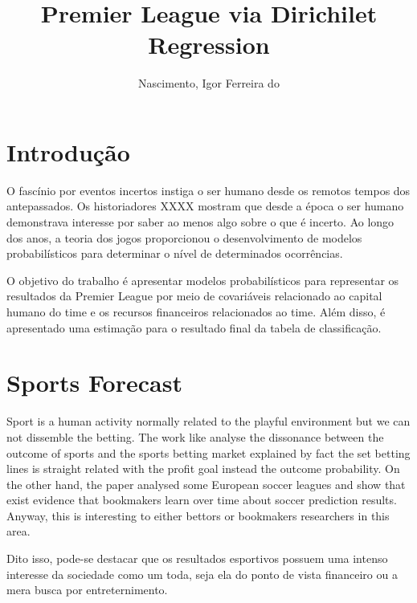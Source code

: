 \documentclass[doc,apacite,oneside,a4paper,12pt]{apa6}
\title{Premier League via Dirichilet Regression }
\author{Nascimento, Igor Ferreira do}
\affiliation{Departamento de Administração - UnB; Laboratório de Aprendizado de Máquina em Finanças}
\begin{document}
\singlespacing 
\justify

\maketitle    
                        
\section{Introdução}
\label{sec:int}
\noindent

O fascínio por eventos incertos instiga o ser humano desde os remotos tempos dos antepassados. Os historiadores XXXX mostram que desde a época o ser humano demonstrava interesse por saber ao menos algo sobre o que é incerto. Ao longo dos anos, a teoria dos jogos proporcionou o desenvolvimento de modelos probabilísticos para determinar o nível de determinados ocorrências.



O objetivo do trabalho é apresentar modelos probabilísticos para representar os resultados da Premier League por meio de covariáveis relacionado ao capital humano do time e os recursos financeiros relacionados ao time. Além disso, é apresentado uma estimação para o resultado final da tabela de classificação.

\section{Sports Forecast}
\label{sec:foresport}
\noindent



Sport is a human activity normally related to the playful environment but we can not dissemble the betting. The work like \cite{Kain2014} analyse the dissonance between the outcome of sports and the sports betting market explained by fact the set betting lines is straight related with the profit goal instead the outcome probability. On the other hand, the  paper \cite{Strumbelj2010} analysed  some European soccer leagues and show that exist evidence that bookmakers learn over time about soccer prediction results. Anyway, this is interesting to either bettors or bookmakers researchers in this area.



Dito isso, pode-se destacar que os resultados esportivos possuem uma intenso interesse da sociedade como um toda, seja ela do ponto de vista financeiro ou a mera busca por entreternimento.
\end{document}

